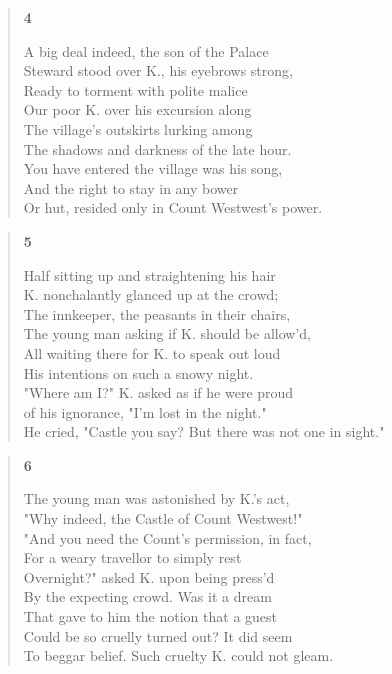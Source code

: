 \documentclass{article}
\begin{document}
\newpage
\begin{verse}
    \begin{center}
    \textbf{4} \\
  \end{center}
A big deal indeed, the son of the Palace \\
Steward stood over K., his eyebrows strong, \\
Ready to torment with polite malice \\
Our poor K. over his excursion along \\
The village's outskirts lurking among \\
The shadows and darkness of the late hour. \\
You have entered the village was his song, \\
And the right to stay in any bower \\
Or hut, resided only in Count Westwest's power.
\end{verse}
\begin{verse}
    \begin{center}
    \textbf{5} \\
  \end{center}
Half sitting up and straightening his hair \\
K. nonchalantly glanced up at the crowd;  \\
The innkeeper, the peasants in their chairs,  \\
The young man asking if K. should be allow'd, \\
All waiting there for K. to speak out loud \\
His intentions on such a snowy night. \\
"Where am I?" K. asked as if he were proud \\
of his ignorance,  "I'm lost in the night." \\
He cried, "Castle you say? But there was not one in sight."
\end{verse}
\begin{verse}
  \begin{center}
    \textbf{6} \\
  \end{center}
  The young man was astonished by K.'s act, \\
  "Why indeed, the Castle of Count Westwest!" \\
  "And you need the Count's permission, in fact, \\
  For a weary travellor to simply rest \\
  Overnight?" asked K. upon being press'd \\
  By the expecting crowd. Was it a dream \\
  That gave to him the notion that a guest \\
  Could be so cruelly turned out? It did seem \\
  To beggar belief. Such cruelty K. could not gleam.
\end{verse}
\end{document}
